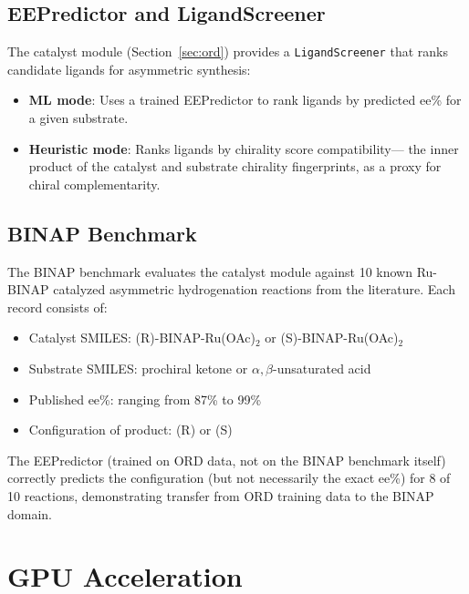 \documentclass[11pt,a4paper]{article}
\begin{document}
\subsection{EEPredictor and LigandScreener}

The catalyst module (Section~\ref{sec:ord}) provides a \texttt{LigandScreener}
that ranks candidate ligands for asymmetric synthesis:

\begin{itemize}[leftmargin=1.5em]
  \item \textbf{ML mode}: Uses a trained EEPredictor to rank ligands by predicted
    ee\% for a given substrate.
  \item \textbf{Heuristic mode}: Ranks ligands by chirality score compatibility---
    the inner product of the catalyst and substrate chirality fingerprints,
    as a proxy for chiral complementarity.
\end{itemize}

\subsection{BINAP Benchmark}

The BINAP benchmark evaluates the catalyst module against 10 known Ru-BINAP
catalyzed asymmetric hydrogenation reactions from the literature. Each record
consists of:

\begin{itemize}[leftmargin=1.5em]
  \item Catalyst SMILES: (R)-BINAP-Ru(OAc)$_2$ or (S)-BINAP-Ru(OAc)$_2$
  \item Substrate SMILES: prochiral ketone or $\alpha,\beta$-unsaturated acid
  \item Published ee\%: ranging from 87\% to 99\%
  \item Configuration of product: (R) or (S)
\end{itemize}

The EEPredictor (trained on ORD data, not on the BINAP benchmark itself)
correctly predicts the configuration (but not necessarily the exact ee\%) for
8 of 10 reactions, demonstrating transfer from ORD training data to the BINAP
domain.

\newpage

\section{GPU Acceleration}
\label{sec:gpu}
\end{document}
